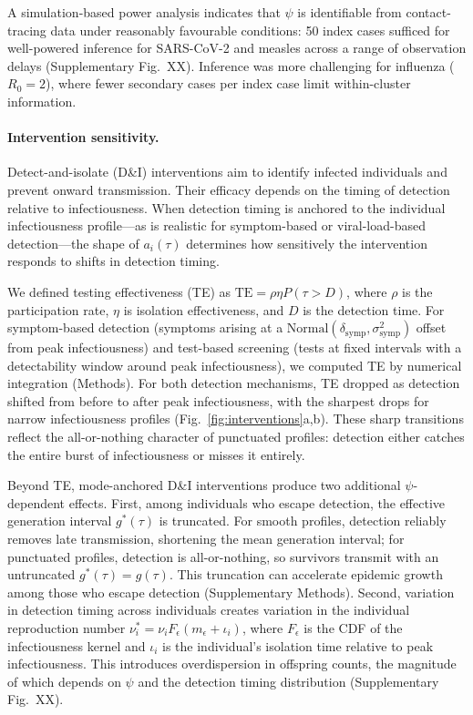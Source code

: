 \documentclass[10pt]{article}
\begin{document}
A simulation-based power analysis indicates that $\psi$ is identifiable from contact-tracing data under reasonably favourable conditions: 50 index cases sufficed for well-powered inference for SARS-CoV-2 and measles across a range of observation delays (Supplementary Fig.~XX). Inference was more challenging for influenza ($R_0 = 2$), where fewer secondary cases per index case limit within-cluster information.

\paragraph{Intervention sensitivity.}
Detect-and-isolate (D\&I) interventions aim to identify infected individuals and prevent onward transmission. Their efficacy depends on the timing of detection relative to infectiousness. When detection timing is anchored to the individual infectiousness profile---as is realistic for symptom-based or viral-load-based detection---the shape of $a_i(\tau)$ determines how sensitively the intervention responds to shifts in detection timing.

We defined testing effectiveness (TE) as $\text{TE} = \rho \eta P(\tau > D)$, where $\rho$ is the participation rate, $\eta$ is isolation effectiveness, and $D$ is the detection time\citep{middleton_modeling_2024}. For symptom-based detection (symptoms arising at a $\text{Normal}(\delta_\text{symp}, \sigma_\text{symp}^2)$ offset from peak infectiousness) and test-based screening (tests at fixed intervals with a detectability window around peak infectiousness), we computed TE by numerical integration (Methods). For both detection mechanisms, TE dropped as detection shifted from before to after peak infectiousness, with the sharpest drops for narrow infectiousness profiles (Fig.~\ref{fig:interventions}a,b). These sharp transitions reflect the all-or-nothing character of punctuated profiles: detection either catches the entire burst of infectiousness or misses it entirely.

Beyond TE, mode-anchored D\&I interventions produce two additional $\psi$-dependent effects. First, among individuals who escape detection, the effective generation interval $g^*(\tau)$ is truncated. For smooth profiles, detection reliably removes late transmission, shortening the mean generation interval; for punctuated profiles, detection is all-or-nothing, so survivors transmit with an untruncated $g^*(\tau) = g(\tau)$. This truncation can accelerate epidemic growth among those who escape detection (Supplementary Methods). Second, variation in detection timing across individuals creates variation in the individual reproduction number $\nu_i^* = \nu_i F_\epsilon(m_\epsilon + \iota_i)$, where $F_\epsilon$ is the CDF of the infectiousness kernel and $\iota_i$ is the individual's isolation time relative to peak infectiousness. This introduces overdispersion in offspring counts, the magnitude of which depends on $\psi$ and the detection timing distribution (Supplementary Fig.~XX).
\end{document}
